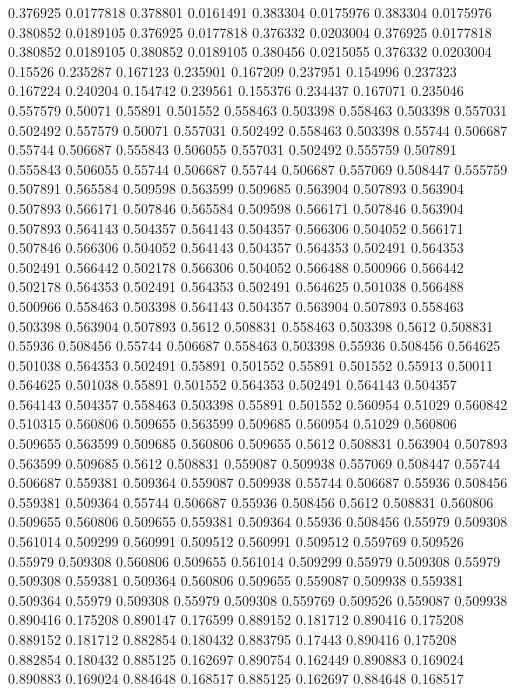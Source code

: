 0.376925 0.0177818
0.378801 0.0161491
0.383304 0.0175976
0.383304 0.0175976
0.380852 0.0189105
0.376925 0.0177818
0.376332 0.0203004
0.376925 0.0177818
0.380852 0.0189105
0.380852 0.0189105
0.380456 0.0215055
0.376332 0.0203004
0.15526 0.235287
0.167123 0.235901
0.167209 0.237951
0.154996 0.237323
0.167224 0.240204
0.154742 0.239561
0.155376 0.234437
0.167071 0.235046
0.557579 0.50071
0.55891 0.501552
0.558463 0.503398
0.558463 0.503398
0.557031 0.502492
0.557579 0.50071
0.557031 0.502492
0.558463 0.503398
0.55744 0.506687
0.55744 0.506687
0.555843 0.506055
0.557031 0.502492
0.555759 0.507891
0.555843 0.506055
0.55744 0.506687
0.55744 0.506687
0.557069 0.508447
0.555759 0.507891
0.565584 0.509598
0.563599 0.509685
0.563904 0.507893
0.563904 0.507893
0.566171 0.507846
0.565584 0.509598
0.566171 0.507846
0.563904 0.507893
0.564143 0.504357
0.564143 0.504357
0.566306 0.504052
0.566171 0.507846
0.566306 0.504052
0.564143 0.504357
0.564353 0.502491
0.564353 0.502491
0.566442 0.502178
0.566306 0.504052
0.566488 0.500966
0.566442 0.502178
0.564353 0.502491
0.564353 0.502491
0.564625 0.501038
0.566488 0.500966
0.558463 0.503398
0.564143 0.504357
0.563904 0.507893
0.558463 0.503398
0.563904 0.507893
0.5612 0.508831
0.558463 0.503398
0.5612 0.508831
0.55936 0.508456
0.55744 0.506687
0.558463 0.503398
0.55936 0.508456
0.564625 0.501038
0.564353 0.502491
0.55891 0.501552
0.55891 0.501552
0.55913 0.50011
0.564625 0.501038
0.55891 0.501552
0.564353 0.502491
0.564143 0.504357
0.564143 0.504357
0.558463 0.503398
0.55891 0.501552
0.560954 0.51029
0.560842 0.510315
0.560806 0.509655
0.563599 0.509685
0.560954 0.51029
0.560806 0.509655
0.563599 0.509685
0.560806 0.509655
0.5612 0.508831
0.563904 0.507893
0.563599 0.509685
0.5612 0.508831
0.559087 0.509938
0.557069 0.508447
0.55744 0.506687
0.559381 0.509364
0.559087 0.509938
0.55744 0.506687
0.55936 0.508456
0.559381 0.509364
0.55744 0.506687
0.55936 0.508456
0.5612 0.508831
0.560806 0.509655
0.560806 0.509655
0.559381 0.509364
0.55936 0.508456
0.55979 0.509308
0.561014 0.509299
0.560991 0.509512
0.560991 0.509512
0.559769 0.509526
0.55979 0.509308
0.560806 0.509655
0.561014 0.509299
0.55979 0.509308
0.55979 0.509308
0.559381 0.509364
0.560806 0.509655
0.559087 0.509938
0.559381 0.509364
0.55979 0.509308
0.55979 0.509308
0.559769 0.509526
0.559087 0.509938
0.890416 0.175208
0.890147 0.176599
0.889152 0.181712
0.890416 0.175208
0.889152 0.181712
0.882854 0.180432
0.883795 0.17443
0.890416 0.175208
0.882854 0.180432
0.885125 0.162697
0.890754 0.162449
0.890883 0.169024
0.890883 0.169024
0.884648 0.168517
0.885125 0.162697
0.884648 0.168517
